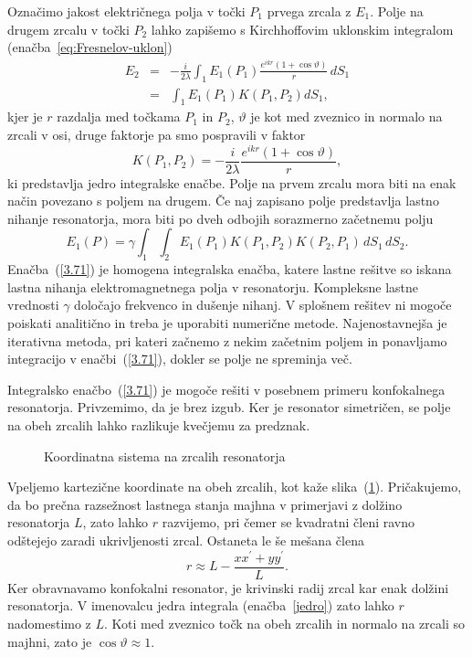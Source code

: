 Označimo jakost električnega polja v točki $P_{1}$ prvega zrcala z $E_{1}$.
Polje na drugem zrcalu v točki $P_2$ lahko zapišemo s Kirchhoffovim uklonskim
integralom (enačba~\ref{eq:Fresnelov-uklon})
\begin{eqnarray}
E_{2} & = & -\frac{i}{2\lambda}\int_{1}E_{1}(P_{1})\frac{e^{ikr}(1+\cos\vartheta)}{r}\, dS_{1} \\
 & = & \int_{1}E_{1}(P_{1})K(P_{1},P_{2})dS_{1},
\label{eq:resuklon}
\end{eqnarray}
kjer je $r$ razdalja med točkama $P_{1}$ in $P_{2}$, $\vartheta$
je kot med zveznico in normalo na zrcali v osi, druge faktorje pa smo pospravili v faktor
\begin{equation}
K(P_{1},P_{2}) = -\frac{i}{2\lambda}\frac{e^{ikr}(1+\cos\vartheta)}{r},
\label{jedro}
\end{equation}
ki predstavlja jedro integralske enačbe. Polje na prvem zrcalu mora
biti na enak način povezano s poljem na drugem. Če naj zapisano polje predstavlja lastno nihanje
resonatorja, mora biti po dveh odbojih sorazmerno začetnemu polju
\begin{equation}
E_{1}(P)=\gamma\int_{1}\int_{2}E_{1}(P_{1})K(P_{1},P_{2})K(P_{2},P_1)\, dS_{1}\, dS_{2}.
\label{3.71}
\end{equation}
Enačba~(\ref{3.71}) je homogena integralska enačba, katere lastne
rešitve so iskana lastna nihanja elektromagnetnega polja v resonatorju.
Kompleksne lastne vrednosti $\gamma$ določajo frekvenco in dušenje
nihanj. V splošnem rešitev ni mogoče poiskati analitično in treba je uporabiti 
numerične metode. Najenostavnejša je iterativna
metoda, pri kateri začnemo z nekim začetnim poljem in ponavljamo integracijo
v enačbi~(\ref{3.71}), dokler se polje ne spreminja več.

Integralsko enačbo~(\ref{3.71}) je mogoče rešiti v posebnem primeru
konfokalnega resonatorja. Privzemimo, da je brez izgub. 
Ker je resonator simetričen, se polje na obeh zrcalih lahko razlikuje kvečjemu
za predznak.
\begin{figure}[h]
\centering
\def\svgwidth{110truemm} 

\caption{Koordinatna sistema na zrcalih resonatorja}
\label{fig:uklon_res_shema}
\end{figure}
Vpeljemo kartezične koordinate na obeh zrcalih, kot kaže slika~(\ref{fig:uklon_res_shema}).
Pričakujemo, da bo prečna razsežnost lastnega stanja majhna v primerjavi
z dolžino resonatorja $L$, zato lahko $r$ razvijemo, pri čemer se kvadratni členi ravno odštejejo 
zaradi ukrivljenosti zrcal. Ostaneta le še mešana člena
\begin{equation}
r\approx L-\frac{xx^{\prime}+yy^{\prime}}{L}.
\label{3.72}
\end{equation}
Ker obravnavamo konfokalni resonator, je krivinski radij zrcal kar enak dolžini resonatorja.
V imenovalcu jedra integrala (enačba~\ref{jedro}) zato lahko $r$ nadomestimo
z $L$. Koti med zveznico točk na obeh zrcalih in normalo na zrcali
so majhni, zato je  $\cos\vartheta \approx 1$. 

